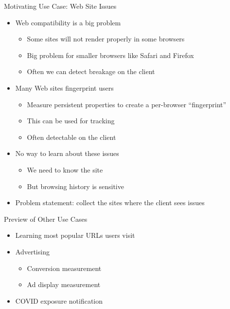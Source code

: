 \documentclass[helvetica]{beamer}
\begin{document}
\begin{frame}{Motivating Use Case: Web Site Issues}

  \begin{itemize}
  \item Web compatibility is a big problem
    \begin{itemize}
    \item Some sites will not render properly in some browsers
    \item Big problem for smaller browsers like Safari and Firefox
    \item Often we can detect breakage on the client      
    \end{itemize}
    
  \item Many Web sites fingerprint users
    \begin{itemize}
    \item Measure persistent properties to create a per-browser ``fingerprint''
    \item This can be used for tracking
    \item Often detectable on the client
    \end{itemize}

  \item No way to learn about these issues
    \begin{itemize}
    \item We need to know the site
    \item But browsing history is sensitive      
    \end{itemize}

  \item Problem statement: collect the sites where the client sees issues
  \end{itemize}
\end{frame}


\begin{frame}{Preview of Other Use Cases}
  \begin{itemize}
  \item Learning most popular URLs users visit
  \item Advertising
    \begin{itemize}
    \item Conversion measurement
    \item Ad display measurement      
    \end{itemize}
  \item COVID exposure notification
  \end{itemize}
\end{frame}
\end{document}
